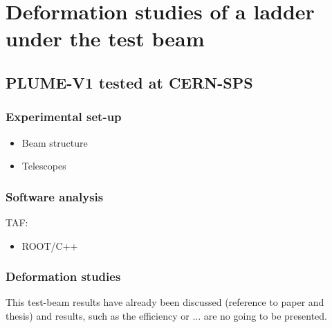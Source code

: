 \chapter{Deformation studies of a ladder under the test beam}

  \section{PLUME-V1 tested at CERN-SPS}
    \subsection{Experimental set-up}

     \begin{itemize}
       \item Beam structure
       \item Telescopes
     \end{itemize}

    \begin{figure}
    \end{figure}

    \subsection{Software analysis}

      TAF:
      \begin{itemize}
        \item ROOT/C++
      \end{itemize}

    \subsection{Deformation studies}
    
    This test-beam results have already been discussed (reference to paper and thesis) and results, such as the efficiency or ... are no going to be presented.

    \begin{figure}
    \end{figure}

    \begin{figure}
    \end{figure}


